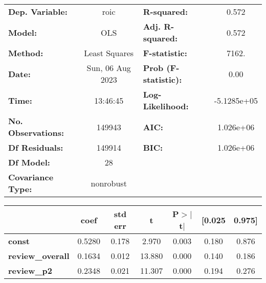 \begin{center}
\begin{tabular}{lclc}
\toprule
\textbf{Dep. Variable:}                                               &       roic       & \textbf{  R-squared:         } &      0.572   \\
\textbf{Model:}                                                       &       OLS        & \textbf{  Adj. R-squared:    } &      0.572   \\
\textbf{Method:}                                                      &  Least Squares   & \textbf{  F-statistic:       } &      7162.   \\
\textbf{Date:}                                                        & Sun, 06 Aug 2023 & \textbf{  Prob (F-statistic):} &      0.00    \\
\textbf{Time:}                                                        &     13:46:45     & \textbf{  Log-Likelihood:    } & -5.1285e+05  \\
\textbf{No. Observations:}                                            &      149943      & \textbf{  AIC:               } &  1.026e+06   \\
\textbf{Df Residuals:}                                                &      149914      & \textbf{  BIC:               } &  1.026e+06   \\
\textbf{Df Model:}                                                    &          28      & \textbf{                     } &              \\
\textbf{Covariance Type:}                                             &    nonrobust     & \textbf{                     } &              \\
\bottomrule
\end{tabular}
\begin{tabular}{lcccccc}
                                                                      & \textbf{coef} & \textbf{std err} & \textbf{t} & \textbf{P$> |$t$|$} & \textbf{[0.025} & \textbf{0.975]}  \\
\midrule
\textbf{const}                                                        &       0.5280  &        0.178     &     2.970  &         0.003        &        0.180    &        0.876     \\
\textbf{review\_overall}                                              &       0.1634  &        0.012     &    13.880  &         0.000        &        0.140    &        0.186     \\
\textbf{review\_p2}                                                   &       0.2348  &        0.021     &    11.307  &         0.000        &        0.194    &        0.276     \\

\end{tabular}
\end{center}
